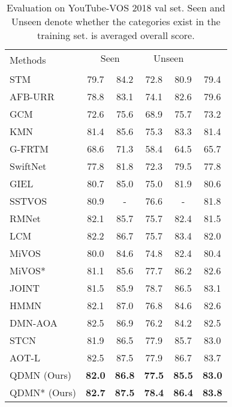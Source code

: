\documentclass[runningheads]{llncs}
\begin{document}
    \begin{table}[t]
    \centering
    \caption{Evaluation on YouTube-VOS 2018 val set. 
    Seen and Unseen denote whether the categories exist in the training set.
     is averaged overall score.}
    \label{youtube}
    \setlength\tabcolsep{11pt}
    \begin{tabular}{lccccc}
        \toprule[1.5pt]
        \multirow{2}{*}{Methods} &
        \multicolumn{2}{c}{Seen} & \multicolumn{2}{c}{Unseen} &
        \multirow{2}{*}{} \\
        \noalign{\smallskip} \cline{2-5} \noalign{\smallskip}
              &  & 
              &  &  \\
        \midrule
STM~\cite{stm}          & 79.7    & 84.2  & 72.8    & 80.9  & 79.4          \\
    AFB-URR~\cite{afb-urr}          & 78.8    & 83.1  & 74.1    & 82.6  & 79.6          \\
    GCM~\cite{gcm}        & 72.6    & 75.6  & 68.9    & 75.7  & 73.2          \\
    KMN~\cite{kmn}          & 81.4    & 85.6  & 75.3   & 83.3  & 81.4          \\
    G-FRTM~\cite{g-frtm}    & 68.6    & 71.3  & 58.4   & 64.5  & 65.7          \\
    SwiftNet~\cite{swiftnet} & 77.8   & 81.8  & 72.3   & 79.5  & 77.8          \\
    GIEL~\cite{giel}         & 80.7   & 85.0  & 75.0   & 81.9  & 80.6          \\
    SSTVOS~\cite{sstvos}     & 80.9   & -     & 76.6     & -     & 81.8          \\
    RMNet~\cite{rmnet}       & 82.1   & 85.7  & 75.7   & 82.4  & 81.5          \\
    LCM~\cite{lcm}           & 82.2 & 86.7 & 75.7  & 83.4    & 82.0          \\
    MiVOS~\cite{mivos}       & {80.0}    & {84.6} & {74.8}   & {82.4}  & {80.4}          \\
    MiVOS*~\cite{mivos}      & {81.1}    & {85.6} & {77.7}  & {86.2} & {82.6}          \\
    JOINT~\cite{joint}                 & 81.5 & 85.9 & 78.7 & 86.5 & 83.1\\
    HMMN~\cite{hmm}                 & 82.1 & 87.0 & 76.8 & 84.6 & 82.6\\
    DMN-AOA~\cite{alignment}                 & 82.5 & 86.9 & 76.2 & 84.2 & 82.5\\
    STCN~\cite{stcn}                 & 81.9 & 86.5 & 77.9 & 85.7 & 83.0\\
    AOT-L~\cite{aot}  & 82.5   & 87.5 & 77.9 & 86.7 & 83.7 \\
    \midrule
    QDMN (Ours)      & \textbf{82.0}  & \textbf{86.8}  & \textbf{77.5}   & \textbf{85.5} & \textbf{83.0} \\
    QDMN* (Ours)     & \textbf{82.7}  & \textbf{87.5}  & \textbf{78.4}   & \textbf{86.4}               & \textbf{83.8} \\
    \bottomrule[1.5pt]
    \end{tabular}
    \end{table}     
\end{document}

